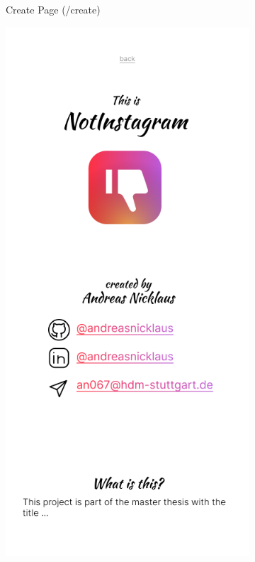\documentclass[a4paper, 12pt]{article}
\begin{document}
\begin{figure}[ht!]
\begin{subfigure}{0.49\linewidth}
\begin{center}
    \end{center}
    \caption{Create Page (/create)}\label{subfig:create}
  \end{subfigure}
  \begin{subfigure}{0.49\linewidth}
    \begin{center}
      \includegraphics[width=\linewidth, height=0.3\textheight, keepaspectratio,frame]{img/ig-clone/Informationsseite.png}

\end{center}
\end{subfigure}
\end{figure}
\end{document}
